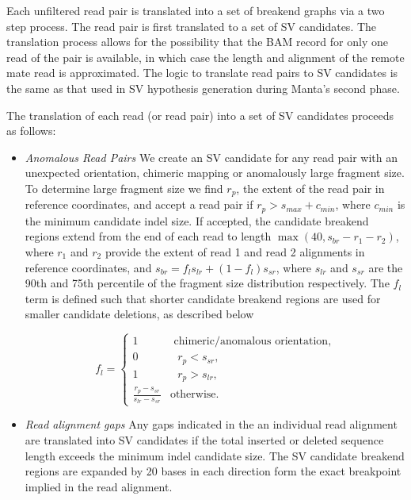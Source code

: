 \documentclass{article}
\begin{document}
Each unfiltered read pair is translated into a set of breakend graphs via a two step process. The read pair is first translated to a set of SV candidates. The translation process allows for the possibility that the BAM record for only one read of the pair is available, in which case the length and alignment of the remote mate read is approximated. The logic to translate read pairs to SV candidates is the same as that used in SV hypothesis generation during Manta's second phase.

The translation of each read (or read pair) into a set of SV candidates proceeds as follows:
\begin{itemize}
\item \textit{Anomalous Read Pairs} We create an SV candidate for any read pair with an unexpected orientation, chimeric mapping or anomalously large fragment size. To determine large fragment size we find $r_p$, the extent of the read pair in reference coordinates, and accept a read pair if $r_p > s_{max} + c_{min}$, where $c_{min}$ is the minimum candidate indel size. If accepted, the candidate breakend regions extend from the end of each read to length $\max(40, s_{br} - r_1 - r_2)$, where $r_1$ and $r_2$ provide the extent of read 1 and read 2 alignments in reference coordinates, and $s_{br}  = f_l s_{lr} + (1 - f_l) s_{sr}$, where $s_{lr}$ and $s_{sr}$ are the 90th and 75th percentile of the fragment size distribution respectively. The $f_l$ term is defined such that shorter candidate breakend regions are used for smaller candidate deletions, as described below

\begin{equation*}
f_l =
\left\{
\begin{array}{cl}
1 & \mbox{ chimeric/anomalous orientation,} \\
0 & \mbox{ $r_p < s_{sr}$, } \\
1 & \mbox{ $r_p > s_{lr}$, } \\
\frac{r_p - s_{sr}} {s_{lr} - s_{sr}} & \mbox{otherwise.}
\end{array}
\right.
\end{equation*}

\item \textit{Read alignment gaps} Any gaps indicated in the an individual read alignment are translated into SV candidates if the total inserted or deleted sequence length exceeds the minimum indel candidate size. The SV candidate breakend regions are expanded by 20 bases in each direction form the exact breakpoint implied in the read alignment.


\end{itemize}
\end{document}
